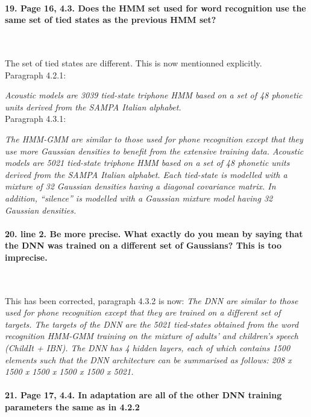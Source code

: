 \documentclass[]{article}
\begin{document}
\paragraph{19. Page 16, 4.3. Does the HMM set used for word recognition use the same set of tied states as the previous HMM set?}

~

The set of tied states are different. This is now mentionned explicitly.\\
Paragraph 4.2.1:

\textit{Acoustic models  are 3039 tied-state triphone HMM based on a set of 48 phonetic units derived from the SAMPA Italian alphabet.}
\\
Paragraph 4.3.1:

\textit{The HMM-GMM are similar to those used for phone recognition except that they use more Gaussian densities to benefit from the extensive training data. Acoustic models  are 5021 tied-state triphone HMM based on a set of  48 phonetic units  derived from the  SAMPA Italian alphabet. Each tied-state is modelled with  a mixture of  32 Gaussian densities   having  a  diagonal   covariance  matrix. In  addition, ``silence''  is  modelled  with  a  Gaussian mixture  model  having  32 Gaussian densities.}
\paragraph{20. line 2. Be more precise. What exactly do you mean by saying that the DNN was trained on a different set of Gaussians? This is too imprecise.}

~

This has been corrected, paragraph 4.3.2 is now:
\textit{The DNN  are similar to those  used for phone  recognition except that they are  trained on a different  set of targets. The  targets of the DNN are the 5021 tied-states obtained from the word recognition HMM-GMM training on the mixture of adults' and children's  speech (ChildIt + IBN). The DNN has 4 hidden  layers, each of which  contains 1500 elements  such that the DNN architecture  can be summarised  as follows: 208  x 1500 x  1500 x 1500 x 1500 x 5021.}

\paragraph{21. Page 17, 4.4. In adaptation are all of the other DNN training parameters the same as in 4.2.2}

~
\end{document}
